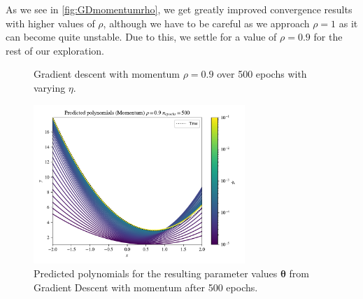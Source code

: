 \documentclass{article}
\theoremstyle{definition}
\begin{document}
As we see in \autoref{fig:GDmomentumrho}, we get greatly improved convergence results with higher values of $\rho$, although we have to be careful as we approach $\rho = 1$ as it can become quite unstable. Due to this, we settle for a value of $\rho = 0.9$ for the rest of our exploration.

\begin{figure}[H]%
    \centering
    \qquad
    \caption{Gradient descent with momentum $\rho=0.9$ over 500 epochs with varying $\eta$.}%
    \label{fig:GDmomentumeta}%
\end{figure}

\begin{figure}[H]%
    \centering
    \includegraphics[width=8cm]{Project2/figures/polynomial_grad/OLS_autodiff/momentum_prediction_eta.pdf}
    \caption{Predicted polynomials for the resulting parameter values $\boldsymbol{\theta}$ from Gradient Descent with momentum after 500 epochs.}
    \label{fig:GDmomentumpred}
\end{figure}
\end{document}
